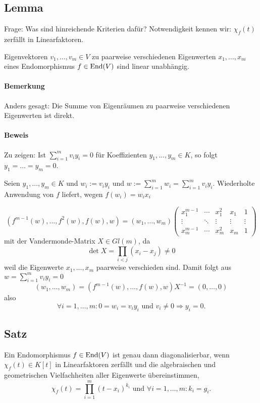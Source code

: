 
\subsection{Lemma}
	Frage: Was sind hinreichende Kriterien dafür? Notwendigkeit kennen wir: $ \chi_f(t) $ zerfällt in Linearfaktoren.
	
	\begin{Lemma}
		Eigenvektoren $ v_1,\dots,v_m\in V $ zu paarweise verschiedenen Eigenwerten $ x_1,\dots,x_m $ eines Endomorphismus $ f\in\operatorname{End}(V) $ sind linear unabhängig.
	\end{Lemma}
\paragraph{Bemerkung}
	Anders gesagt: Die Summe von Eigenräumen zu paarweise verschiedenen Eigenwerten ist direkt.
\paragraph{Beweis}
	Zu zeigen: Ist $ \sum_{i=1}^m v_iy_i = 0 $ für Koeffizienten $ y_1,\dots,y_m\in K $, so folgt $ y_1 = \dots = y_m = 0 $.
	
	Seien $ y_1,\dots,y_m \in K $ und $ w_i := v_iy_i $ und $ w:= \sum_{i=1}^{m}w_i = \sum_{i=1}^{m}v_iy_i$.
	Wiederholte Anwendung von $ f $ liefert, wegen $ f(w_i) = w_ix_i $
	
		\[ (f^{m-1}(w),\dots,f^2(w),f(w),w) = (w_1,\dots,w_m)
		\begin{pmatrix}
		 x_1^{m-1}&\cdots&x_1^2&x_1&1 \\
		 \vdots&\ddots&\vdots&\vdots&\vdots\\
		 x_m^{m-1}&\cdots&x_m^2&x_m & 1
		\end{pmatrix} \]
	mit der Vandermonde-Matrix $ X\in Gl(m) $, da
		\[ \det X = \prod_{i<j} (x_i - x_j)\neq 0 \]
	weil die Eigenwerte $ x_1,\dots,x_m $ paarweise verschieden sind.
	Damit folgt aus $ w=\sum_{i=1}^{m}v_iy_i = 0 $
		\[ (w_1,\dots,w_m)=(f^{m-1}(w),\dots,f(w),w)X^{-1} = (0,\dots,0) \]
	also
		\[ \forall i=1,\dots,m: 0 = w_i = v_iy_i \text{ und }v_i \neq 0 \Rightarrow y_i = 0.  \]
\subsection{Satz}
    \begin{Satz}
		Ein Endomorphismus $ f\in \operatorname{End}(V) $ ist genau dann diagonalisierbar, wenn $ \chi_f(t) \in K[t] $ in Linearfaktoren zerfällt und die algebraischen und geometrischen Vielfachheiten aller Eigenwerte übereinstimmen,
			\[ \chi_f(t) = \prod_{i=1}^{m}(t-x_i)^{k_i} \text{ und } \forall i=1,\dots,m: k_i = g_i.\]
	\end{Satz}
